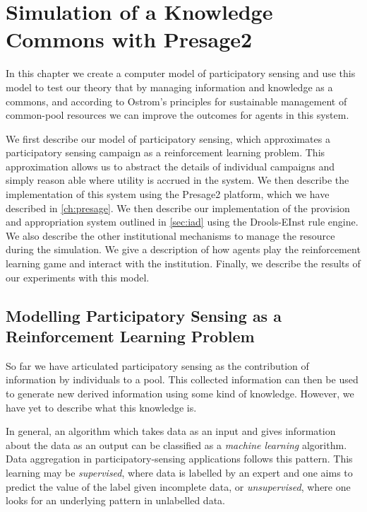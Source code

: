 \acresetall
\chapter{Simulation of a Knowledge Commons with Presage2}

In this chapter we create a computer model of participatory sensing and use
this model to test our theory that by managing information and knowledge as a
commons, and according to Ostrom's principles for sustainable management of
common-pool resources we can improve the outcomes for agents in this system.

We first describe our model of participatory sensing, which approximates a
participatory sensing campaign as a reinforcement learning problem. This
approximation allows us to abstract the details of individual campaigns and
simply reason able where utility is accrued in the system. We then describe
the implementation of this system using the Presage2 platform, which we have
described in \autoref{ch:presage}. We then describe our implementation of the
provision and appropriation system outlined in \autoref{sec:iad} using the
Drools-EInst rule engine. We also describe the other institutional mechanisms
to manage the resource during the simulation. We give a description of how
agents play the reinforcement learning game and interact with the institution.
Finally, we describe the results of our experiments with this model.

\section{Modelling Participatory Sensing as a Reinforcement Learning Problem}

So far we have articulated participatory sensing as the contribution of
information by individuals to a pool. This collected information can then be
used to generate new derived information using some kind of knowledge.
However, we have yet to describe what this knowledge is.

In general, an algorithm which takes data as an input and gives information
about the data as an output can be classified as a \emph{machine learning}
algorithm. Data aggregation in participatory-sensing applications follows this
pattern. This learning may be \emph{supervised}, where data is labelled by an
expert and one aims to predict the value of the label given incomplete data,
or \emph{unsupervised}, where one looks for an underlying pattern in
unlabelled data.

